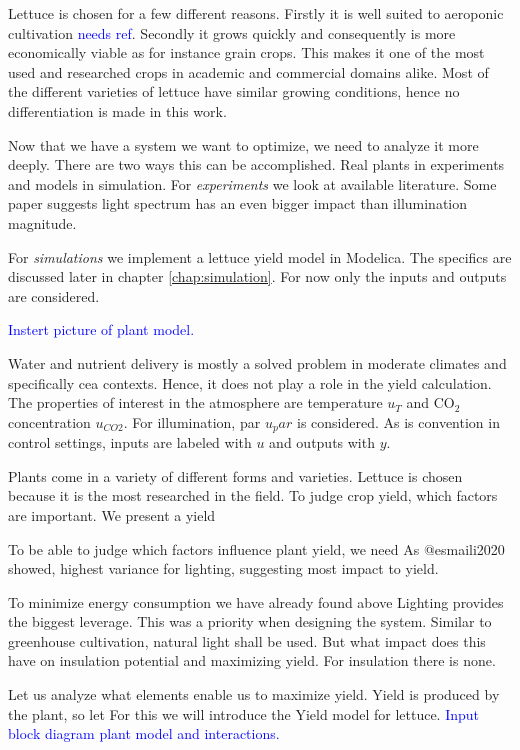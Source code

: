 Lettuce is chosen for a few different reasons.
Firstly it is well suited to aeroponic cultivation \textcolor{Blue}{needs ref}.
Secondly it grows quickly and consequently is more economically viable as for instance grain crops.
This makes it one of the most used and researched crops in academic and commercial domains alike.
Most of the different varieties of lettuce have similar growing conditions, hence no differentiation is made in this work.

Now that we have a system we want to optimize, we need to analyze it more deeply.
There are two ways this can be accomplished.
Real plants in experiments and models in simulation.
For \textit{experiments} we look at available literature.
Some paper suggests light spectrum has an even bigger impact than illumination magnitude.

For \textit{simulations} we implement a lettuce yield model in Modelica.
The specifics are discussed later in chapter \ref{chap:simulation}.
For now only the inputs and outputs are considered.

\textcolor{Blue}{Instert picture of plant model.}

Water and nutrient delivery is mostly a solved problem in moderate climates and specifically \ac{cea} contexts.
Hence, it does not play a role in the yield calculation.
The properties of interest in the atmosphere are temperature $u_T$ and CO$_2$ concentration $u_{CO2}$.
For illumination, \ac{par} $u_par$ is considered.
As is convention in control settings, inputs are labeled with $u$ and outputs with $y$.



Plants come in a variety of different forms and varieties.
Lettuce is chosen because it is the most researched in the field.
To judge crop yield, which factors are important.
We present a yield 

To be able to judge which factors influence plant yield, we need
As @esmaili2020 showed, highest variance for lighting, suggesting most impact to yield.

To minimize energy consumption we have already found above 
Lighting provides the biggest leverage.
This was a priority when designing the system.
Similar to greenhouse cultivation, natural light shall be used.
But what impact does this have on insulation potential and maximizing yield.
For insulation there is none.

Let us analyze what elements enable us to maximize yield.
Yield is produced by the plant, so let 
For this we will introduce the Yield model for lettuce.
\textcolor{Blue}{Input block diagram plant model and interactions.}

